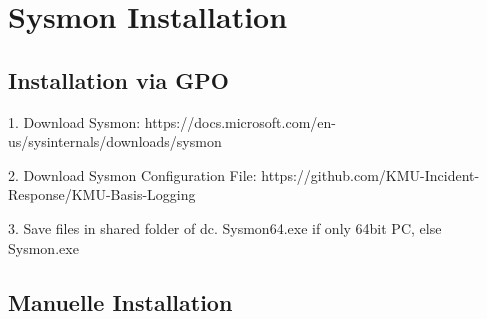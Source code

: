 \chapter{Sysmon Installation}

\section{Installation via GPO}


1. Download Sysmon:
https://docs.microsoft.com/en-us/sysinternals/downloads/sysmon

2. Download Sysmon Configuration File:
https://github.com/KMU-Incident-Response/KMU-Basis-Logging

3. Save files in shared folder of dc.
Sysmon64.exe if only 64bit PC, else Sysmon.exe



%




%



\section{Manuelle Installation}

%
%
%
